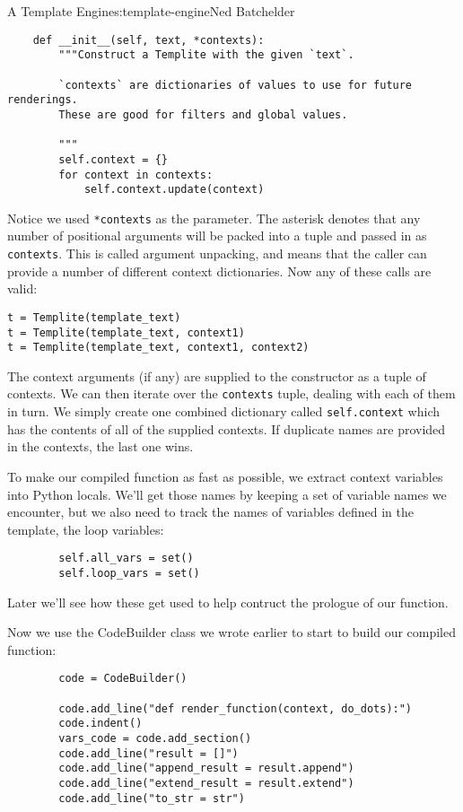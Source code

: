 \begin{aosachapter}{A Template Engine}{s:template-engine}{Ned Batchelder}
\begin{verbatim}
    def __init__(self, text, *contexts):
        """Construct a Templite with the given `text`.

        `contexts` are dictionaries of values to use for future renderings.
        These are good for filters and global values.

        """
        self.context = {}
        for context in contexts:
            self.context.update(context)
\end{verbatim}

Notice we used \texttt{*contexts} as the parameter. The asterisk denotes
that any number of positional arguments will be packed into a tuple and
passed in as \texttt{contexts}. This is called argument unpacking, and
means that the caller can provide a number of different context
dictionaries. Now any of these calls are valid:

\begin{verbatim}
t = Templite(template_text)
t = Templite(template_text, context1)
t = Templite(template_text, context1, context2)
\end{verbatim}

The context arguments (if any) are supplied to the constructor as a
tuple of contexts. We can then iterate over the \texttt{contexts} tuple,
dealing with each of them in turn. We simply create one combined
dictionary called \texttt{self.context} which has the contents of all of
the supplied contexts. If duplicate names are provided in the contexts,
the last one wins.

To make our compiled function as fast as possible, we extract context
variables into Python locals. We'll get those names by keeping a set of
variable names we encounter, but we also need to track the names of
variables defined in the template, the loop variables:

\begin{verbatim}
        self.all_vars = set()
        self.loop_vars = set()
\end{verbatim}

Later we'll see how these get used to help contruct the prologue of our
function.

Now we use the CodeBuilder class we wrote earlier to start to build our
compiled function:

\begin{verbatim}
        code = CodeBuilder()

        code.add_line("def render_function(context, do_dots):")
        code.indent()
        vars_code = code.add_section()
        code.add_line("result = []")
        code.add_line("append_result = result.append")
        code.add_line("extend_result = result.extend")
        code.add_line("to_str = str")
\end{verbatim}


\end{aosachapter}
